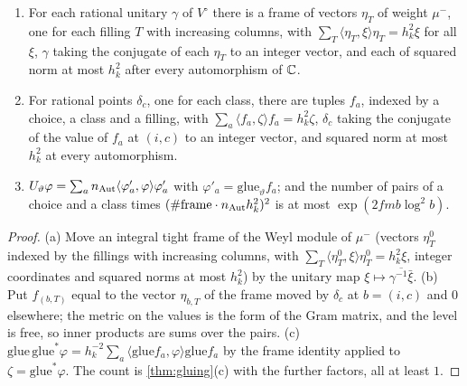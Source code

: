 \begin{lemma}\label{lem:tight-frame}
\begin{enumerate}[label=\textup{(\alph*)}]
\item For each rational unitary $\gamma$ of $V^\circ$ there is a frame of vectors $\eta_T$ of weight $\mu^-$, one for each filling $T$ with increasing columns, with $\sum_T\langle\eta_T,\xi\rangle\eta_T=h_k^2\xi$ for all $\xi$, $\gamma$ taking the conjugate of each $\eta_T$ to an integer
vector, and each of squared norm at most $h_k^2$ after every automorphism of $\mathbb{C}$.
\item For rational points $\delta_c$, one for each class, there are tuples $f_a$, indexed by a choice, a class and a filling, with $\sum_a\langle f_a,\zeta\rangle f_a=h_k^2\zeta$, $\delta_c$ taking the conjugate of the value of $f_a$ at $(i,c)$ to an integer vector, and squared norm
at most $h_k^2$ at every automorphism.
\item $U_\vartheta\varphi=\sum_an_{\rm Aut}\langle\varphi'_a,\varphi\rangle\varphi'_a$ with $\varphi'_a=\mathrm{glue}_\vartheta f_a$; and the number of pairs of a choice and a class times $(\#\text{frame}\cdot n_{\rm Aut}h_k^2)^2$ is at most $\exp(2fmb\log^2b)$.
\end{enumerate}
\end{lemma}

\begin{proof}
(a) Move an integral tight frame of the Weyl module of $\mu^-$ (vectors $\eta^0_T$ indexed by the fillings with increasing columns, with $\sum_T\langle\eta^0_T,\xi\rangle\eta^0_T=h_k^2\xi$,
integer coordinates and squared norms at most $h_k^2$) by the unitary map $\xi\mapsto\overline{\gamma^{-1}\bar\xi}$. (b)
Put $f_{(b,T)}$ equal to the vector $\eta_{b,T}$ of the frame moved by $\delta_c$ at $b=(i,c)$ and $0$ elsewhere; the metric on the values is the form of the Gram matrix, and the level is free, so inner products are sums over the pairs.
(c) $\mathrm{glue}\,\mathrm{glue}^*\varphi=h_k^{-2}\sum_a\langle\mathrm{glue}f_a,\varphi\rangle\mathrm{glue}f_a$ by the frame identity applied to $\zeta=\mathrm{glue}^*\varphi$. The count is \cref{thm:gluing}(c) with the further factors, all at least $1$.
\end{proof}

